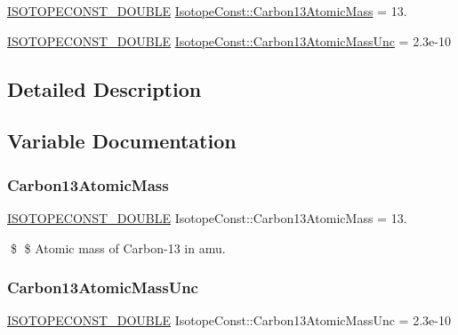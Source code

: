 \begin{DoxyCompactItemize}
\item 
\mbox{\hyperlink{group___isotope_const-_macros_ga8f45a7272ce02c0b4c65c44636ed719a}{I\+S\+O\+T\+O\+P\+E\+C\+O\+N\+S\+T\+\_\+\+D\+O\+U\+B\+LE}} \mbox{\hyperlink{group___isotope_const-_carbon-_c13_ga9601ea43beb22decd8ff829400c0df2d}{Isotope\+Const\+::\+Carbon13\+Atomic\+Mass}} = 13.
\item 
\mbox{\hyperlink{group___isotope_const-_macros_ga8f45a7272ce02c0b4c65c44636ed719a}{I\+S\+O\+T\+O\+P\+E\+C\+O\+N\+S\+T\+\_\+\+D\+O\+U\+B\+LE}} \mbox{\hyperlink{group___isotope_const-_carbon-_c13_ga0b857a7ee5be9b640eebecd63d0aedbe}{Isotope\+Const\+::\+Carbon13\+Atomic\+Mass\+Unc}} = 2.\+3e-\/10
\end{DoxyCompactItemize}


\subsection{Detailed Description}


\subsection{Variable Documentation}
\mbox{\label{group___isotope_const-_carbon-_c13_ga9601ea43beb22decd8ff829400c0df2d}} 
\subsubsection{\texorpdfstring{Carbon13\+Atomic\+Mass}{Carbon13AtomicMass}}
{\footnotesize\ttfamily \mbox{\hyperlink{group___isotope_const-_macros_ga8f45a7272ce02c0b4c65c44636ed719a}{I\+S\+O\+T\+O\+P\+E\+C\+O\+N\+S\+T\+\_\+\+D\+O\+U\+B\+LE}} Isotope\+Const\+::\+Carbon13\+Atomic\+Mass = 13.}

\$ \$ Atomic mass of Carbon-\/13 in amu. \mbox{\label{group___isotope_const-_carbon-_c13_ga0b857a7ee5be9b640eebecd63d0aedbe}} 
\subsubsection{\texorpdfstring{Carbon13\+Atomic\+Mass\+Unc}{Carbon13AtomicMassUnc}}
{\footnotesize\ttfamily \mbox{\hyperlink{group___isotope_const-_macros_ga8f45a7272ce02c0b4c65c44636ed719a}{I\+S\+O\+T\+O\+P\+E\+C\+O\+N\+S\+T\+\_\+\+D\+O\+U\+B\+LE}} Isotope\+Const\+::\+Carbon13\+Atomic\+Mass\+Unc = 2.\+3e-\/10}

